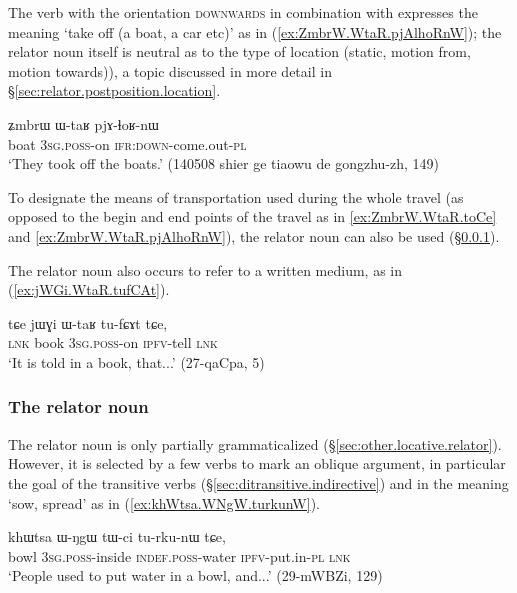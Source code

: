 The verb  with the orientation \textsc{downwards} in combination with  expresses the meaning `take off (a boat, a car etc)' as in (\ref{ex:ZmbrW.WtaR.pjAlhoRnW}); the relator noun itself is neutral as to the type of location (static, motion from, motion towards)), a topic discussed in more detail in §\ref{sec:relator.postposition.location}.

\begin{exe}
\ex \label{ex:ZmbrW.WtaR.pjAlhoRnW}
\gll ʑmbrɯ ɯ-taʁ pjɤ-ɬoʁ-nɯ  \\
boat \textsc{3sg}.\textsc{poss}-on \textsc{ifr}:\textsc{down}-come.out-\textsc{pl} \\
\glt `They took off the boats.' (140508 shier ge tiaowu de gongzhu-zh, 149)
\end{exe} 

To designate the means of transportation used during the whole  travel (as opposed to the begin and end points of the travel as in \ref{ex:ZmbrW.WtaR.toCe} and \ref{ex:ZmbrW.WtaR.pjAlhoRnW}), the relator noun  can also be used (§\ref{sec:WNgW}).

The relator noun  also occurs to refer to a written medium, as in (\ref{ex:jWGi.WtaR.tufCAt}).

\begin{exe}
\ex \label{ex:jWGi.WtaR.tufCAt}
\gll  tɕe jɯɣi ɯ-taʁ tu-fɕɤt tɕe, \\
\textsc{lnk} book \textsc{3sg}.\textsc{poss}-on \textsc{ipfv}-tell \textsc{lnk} \\
\glt `It is told in a book, that...' (27-qaCpa, 5)
\end{exe} 

\subsubsection{The relator noun } \label{sec:WNgW}
The relator noun  is only partially grammaticalized (§\ref{sec:other.locative.relator}). However, it is selected by a few verbs to mark an oblique argument, in particular the goal of the transitive verbs  (§\ref{sec:ditransitive.indirective}) and  in the meaning `sow, spread' as in (\ref{ex:khWtsa.WNgW.turkunW}).

\begin{exe}
\ex \label{ex:khWtsa.WNgW.turkunW}
\gll khɯtsa ɯ-ŋgɯ tɯ-ci tu-rku-nɯ tɕe, \\
bowl \textsc{3sg}.\textsc{poss}-inside  \textsc{indef}.\textsc{poss}-water \textsc{ipfv}-put.in-\textsc{pl} \textsc{lnk} \\
\glt `People used to put water in a bowl, and...' (29-mWBZi, 129)
\end{exe} 

